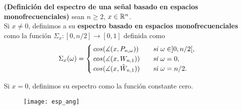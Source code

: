 \begin{defi}
\label{def: espectro monofrecuenciales inicial}
\textbf{(Definición del espectro de una señal
basado en espacios monofrecuenciales)}
sean $n \geq 2$, $x \in \mathbb{R}^{n}$. \\

Si $x \neq 0$, definimos a su \textbf{espectro basado
en espacios monofrecuenciales} como la función 
$\Sigma_{x}: [0, n/2] \longrightarrow [0,1]$
definida como
\begin{align*}
\Sigma_{x}(\omega)= \begin{cases}
cos(\measuredangle(x, P_{n, \omega})) & 
\hspace{0.2cm} \textit{ si } \omega \in ]0, n/2[, \\
cos(\measuredangle(x, W_{n,1})) & \hspace{0.2cm} \textit{ si } \omega = 0, \\
cos(\measuredangle(x, \tilde{W}_{n,1})) & \hspace{0.2cm} \textit{ si } \omega = n/2.
\end{cases}
\end{align*}

Si $x = 0$, definimos su espectro como la 
función constante cero.
\end{defi}


\begin{figure}[H]
	\centering
	\texttt{[image: esp\_ang]} 
\end{figure}	

\begin{comment}
Esta última proposición es importante, pues relaciona
el espectro de una señal 
con sus primeros dos coeficientes respecto a la base
de Legendre discreta $\cali{L}^{n}$. \\
Note que este es un resultado razonable, pues, por
definición del espectro $\Sigma_{x}$, si $\omega \geq 0$,
$\Sigma_{x}(\omega)$ es el coseno del ángulo que
$x$ forma con el espacio $P_{n, \omega} = 
span \left\{ cos \left(
2 \pi \omega\frac{m}{n}
\right)_{m=0}^{n-1},  
sen \left(
2 \pi \omega\frac{m}{n}
\right)_{m=0}^{n-1} \right\}$, y, conforme
$\omega$ tiende a cero por la derecha, 
las discretizaciones de coseno y seno que generan
el espacio $P_{n, \omega}$ tienden a ser las discretizaciones
de cosenos y senos de muy baja frecuencia, luego, intuitivamente
son las discretizaciones de las rectas tangentes de un coseno
y un seno en $t =0$, que son las rectas $y=1$
y $y =x$. Observe que discretizaciones de estas dos rectas
conforman una base para el espacio $W_{n,1}$.
\end{comment}

